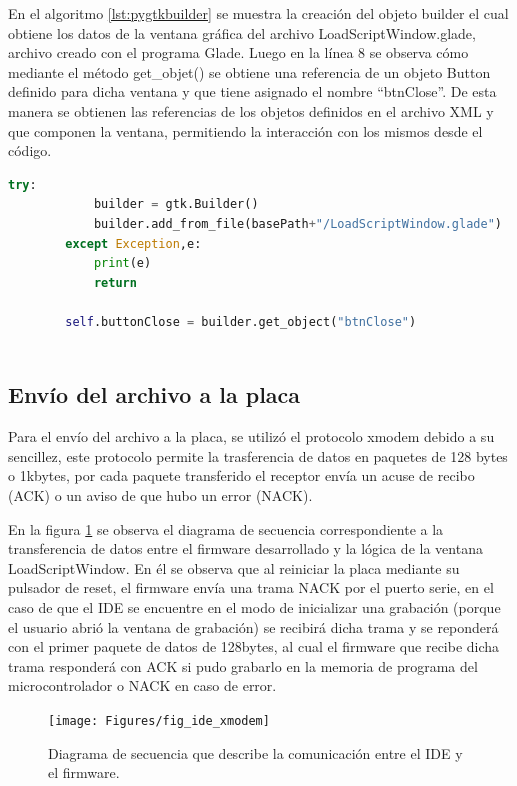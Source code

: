 En el algoritmo \ref{lst:pygtkbuilder} se muestra la creación del objeto builder el cual obtiene los datos de la ventana gráfica del archivo LoadScriptWindow.glade, archivo creado con el programa Glade. Luego en la línea 8 se observa cómo mediante el método get\_objet() se obtiene una referencia de un objeto Button definido para dicha ventana y que tiene asignado el nombre “btnClose”. De esta manera se obtienen las referencias de los objetos definidos en el archivo XML y que componen la ventana, permitiendo la interacción con los mismos desde el código.

\begin{lstlisting}[language={python},label={lst:pygtkbuilder},caption=Porción de código que muestra la creación de la ventana a partir del archivo glade] 
		try:
			builder = gtk.Builder()
			builder.add_from_file(basePath+"/LoadScriptWindow.glade")
		except Exception,e:
			print(e)
			return

		self.buttonClose = builder.get_object("btnClose")
		
\end{lstlisting}

\subsection{Envío del archivo a la placa}

Para el envío del archivo a la placa, se utilizó el protocolo xmodem debido a su sencillez, este protocolo permite la trasferencia de datos en paquetes de 128 bytes o 1kbytes, por cada paquete transferido el receptor envía un acuse de recibo (ACK) o un aviso de que hubo un error (NACK).

En la figura \ref{fig:secuencexmodem} se observa el diagrama de secuencia correspondiente a la transferencia de datos entre el firmware desarrollado y la lógica de la ventana LoadScriptWindow.
En él se observa que al reiniciar la placa mediante su pulsador de reset, el firmware envía una trama NACK por el puerto serie, en el caso de que el IDE se encuentre en el modo de inicializar una grabación (porque el usuario abrió la ventana de grabación) se recibirá dicha trama y se reponderá con el primer paquete de datos de 128bytes, al cual el firmware que recibe dicha trama responderá con ACK si pudo grabarlo en la memoria de programa del microcontrolador o NACK en caso de error. 

\begin{figure}[ht]
  \centering
    \texttt{[image: Figures/fig\_ide\_xmodem]}
  \caption{Diagrama de secuencia que describe la comunicación entre el IDE y el firmware.}
  \label{fig:secuencexmodem}
\end{figure}

